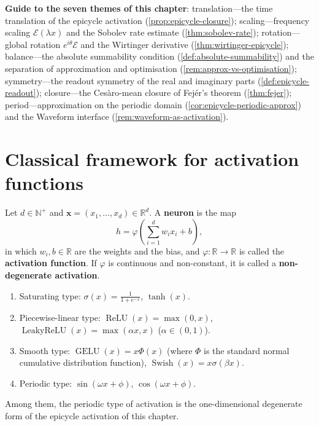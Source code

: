 \begin{remark}
\textbf{Guide to the seven themes of this chapter}: translation---the time translation of the epicycle activation (\cref{prop:epicycle-closure}); scaling---frequency scaling $\mathcal E(\lambda x)$ and the Sobolev rate estimate (\cref{thm:sobolev-rate}); rotation---global rotation $e^{i\theta}\mathcal E$ and the Wirtinger derivative (\cref{thm:wirtinger-epicycle}); balance---the absolute summability condition (\cref{def:absolute-summability}) and the separation of approximation and optimisation (\cref{rem:approx-vs-optimisation}); symmetry---the readout symmetry of the real and imaginary parts (\cref{def:epicycle-readout}); closure---the Cesàro-mean closure of Fejér's theorem (\cref{thm:fejer}); period---approximation on the periodic domain (\cref{cor:epicycle-periodic-approx}) and the Waveform interface (\cref{rem:waveform-as-activation}).
\end{remark}

\section{Classical framework for activation functions}

\begin{definition}\label{def:scalar-activation}
Let $d\in\mathbb N^+$ and $\mathbf x=(x_1,\dots,x_d)\in\mathbb R^d$. A \textbf{neuron} is the map
\[
h=\varphi\left(\sum_{i=1}^{d}w_i x_i+b\right),
\]
in which $w_i,b\in\mathbb R$ are the weights and the bias, and $\varphi:\mathbb R\to\mathbb R$ is called the \textbf{activation function}. If $\varphi$ is continuous and non-constant, it is called a \textbf{non-degenerate activation}.
\end{definition}

\begin{example}\label{ex:classical-activations}
\begin{enumerate}[label=(\roman*)]
    \item Saturating type: $\sigma(x)=\frac{1}{1+e^{-x}}$, $\tanh(x)$.
    \item Piecewise-linear type: $\operatorname{ReLU}(x)=\max(0,x)$, $\operatorname{LeakyReLU}(x)=\max(\alpha x,x)$ ($\alpha\in(0,1)$).
    \item Smooth type: $\operatorname{GELU}(x)=x\Phi(x)$ (where $\Phi$ is the standard normal cumulative distribution function), $\operatorname{Swish}(x)=x\sigma(\beta x)$.
    \item Periodic type: $\sin(\omega x+\phi)$, $\cos(\omega x+\phi)$.
\end{enumerate}
Among them, the periodic type of activation is the one-dimensional degenerate form of the epicycle activation of this chapter.
\end{example}


